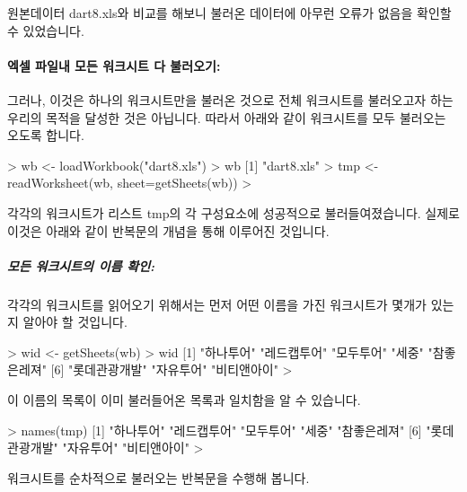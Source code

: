 \documentclass[tutorial.tex]{subfiles}
\begin{document}
원본데이터 dart8.xls와 비교를 해보니 불러온 데이터에 아무런 오류가 없음을 확인할 수 있었습니다.


\paragraph{엑셀 파일내 모든 워크시트 다 불러오기:} 
그러나, 이것은 하나의 워크시트만을 불러온 것으로 전체 워크시트를 불러오고자 하는 우리의 목적을 달성한 것은 아닙니다.
따라서 아래와 같이 워크시트를 모두 불러오는 오도록 합니다.

\begin{Schunk}
\begin{Soutput}
> wb <- loadWorkbook("dart8.xls")
> wb
[1] "dart8.xls"
> tmp <- readWorksheet(wb, sheet=getSheets(wb))
>
\end{Soutput}
\end{Schunk}

각각의 워크시트가 리스트 tmp의 각 구성요소에 성공적으로 불러들여졌습니다. 
실제로 이것은 아래와 같이 반복문의 개념을 통해 이루어진 것입니다.

\subparagraph{모든 워크시트의 이름 확인:} 
각각의 워크시트를 읽어오기 위해서는 먼저 어떤 이름을 가진 워크시트가 몇개가 있는지 알아야 할 것입니다.

\begin{Schunk}
\begin{Soutput}
> wid <- getSheets(wb)
> wid
[1] "하나투어"     "레드캡투어"   "모두투어"     "세중"         "참좋은레져"  
[6] "롯데관광개발" "자유투어"     "비티앤아이"  
> 
\end{Soutput}
\end{Schunk}

이 이름의 목록이 이미 불러들어온 목록과 일치함을 알 수 있습니다.

\begin{Schunk}
\begin{Soutput}
> names(tmp)
[1] "하나투어"     "레드캡투어"   "모두투어"     "세중"         "참좋은레져"  
[6] "롯데관광개발" "자유투어"     "비티앤아이"  
> 
\end{Soutput}
\end{Schunk}

워크시트를 순차적으로 불러오는 반복문을 수행해 봅니다.
\end{document}
